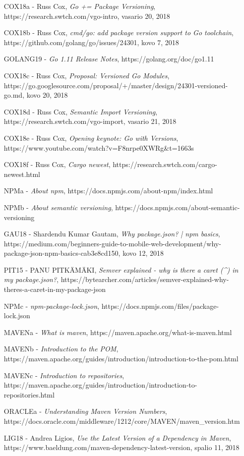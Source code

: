 
\begin{itemize}
    \item [COX18a] - Russ Cox, \emph{Go += Package Versioning}, https://research.swtch.com/vgo-intro, vasario 20, 2018
    \item [COX18b] - Russ Cox, \emph{cmd/go: add package version support to Go toolchain}, https://github.com/golang/go/issues/24301, kovo 7, 2018
    \item [GOLANG19] - \emph{Go 1.11 Release Notes}, https://golang.org/doc/go1.11
    \item [COX18c] - Russ Cox, \emph{Proposal: Versioned Go Modules}, https://go.googlesource.com/proposal/+/master/design/24301-versioned-go.md, kovo 20, 2018
    \item [COX18d] - Russ Cox, \emph{Semantic Import Versioning}, https://research.swtch.com/vgo-import, vasario 21, 2018
    \item [COX18e] - Russ Cox, \emph{Opening keynote: Go with Versions}, https://www.youtube.com/watch?v=F8nrpe0XWRg\&t=1663s
    \item [COX18f] - Russ Cox, \emph{Cargo newest}, https://research.swtch.com/cargo-newest.html
    \item[NPMa] - \emph{About npm}, https://docs.npmjs.com/about-npm/index.html
    \item[NPMb] - \emph{About semantic versioning}, https://docs.npmjs.com/about-semantic-versioning
    \item[GAU18] - Shardendu Kumar Gautam, \emph{Why package.json? | npm basics}, https://medium.com/beginners-guide-to-mobile-web-development/why-package-json-npm-basics-cab3e8cd150, kovo 12, 2018
    \item[PIT15] - PANU PITKÄMÄKI, \emph{Semver explained - why is there a caret (\textasciicircum) in my package.json?}, https://bytearcher.com/articles/semver-explained-why-theres-a-caret-in-my-package-json
    \item[NPMc] - \emph{npm-package-lock.json}, https://docs.npmjs.com/files/package-lock.json
    \item[MAVENa] - \emph{What is maven}, https://maven.apache.org/what-is-maven.html
    \item[MAVENb] - \emph{Introduction to the POM}, https://maven.apache.org/guides/introduction/introduction-to-the-pom.html
    \item[MAVENc] - \emph{Introduction to repositories}, https://maven.apache.org/guides/introduction/introduction-to-repositories.html
    \item[ORACLEa] - \emph{Understanding Maven Version Numbers}, https://docs.oracle.com/middleware/1212/core/MAVEN/maven\_version.htm
    \item[LIG18] - Andrea Ligios, \emph{Use the Latest Version of a Dependency in Maven}, https://www.baeldung.com/maven-dependency-latest-version, spalio 11, 2018
\end{itemize}

